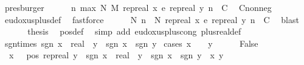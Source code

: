 \begin{isabellebody}
\ presburger\isanewline
\ \ \ \ \isamarkupfalse%
\ {\isachardoublequoteopen}{\isasymforall}n{\isasymge}\ max\ N\ M{\isachardot}{\kern0pt}\ {\isacharparenleft}{\kern0pt}rep{\isacharunderscore}{\kern0pt}real\ x\ {\isacharplus}{\kern0pt}\isactrlsub e\ rep{\isacharunderscore}{\kern0pt}real\ y{\isacharparenright}{\kern0pt}\ n\ {\isasymge}\ C{\isachardoublequoteclose}\ \isamarkupfalse%
\ C{\isacharunderscore}{\kern0pt}nonneg\ \isamarkupfalse%
\ eudoxus{\isacharunderscore}{\kern0pt}plus{\isacharunderscore}{\kern0pt}def\ \isamarkupfalse%
\ fastforce\isanewline
\ \ \ \ \isamarkupfalse%
\ {\isachardoublequoteopen}{\isasymexists}N{\isachardot}{\kern0pt}\ {\isasymforall}n\ {\isasymge}\ N{\isachardot}{\kern0pt}\ {\isacharparenleft}{\kern0pt}rep{\isacharunderscore}{\kern0pt}real\ x\ {\isacharplus}{\kern0pt}\isactrlsub e\ rep{\isacharunderscore}{\kern0pt}real\ y{\isacharparenright}{\kern0pt}\ n\ {\isasymge}\ C{\isachardoublequoteclose}\ \isamarkupfalse%
\ blast\isanewline
\ \ \isacommand{{\isacharbraceright}{\kern0pt}}\isamarkupfalse%
\isanewline
\ \ \isamarkupfalse%
\ {\isacharquery}{\kern0pt}thesis\ \isamarkupfalse%
\ pos{\isacharunderscore}{\kern0pt}def\ \isamarkupfalse%
\ {\isacharparenleft}{\kern0pt}simp\ add{\isacharcolon}{\kern0pt}\ eudoxus{\isacharunderscore}{\kern0pt}plus{\isacharunderscore}{\kern0pt}cong\ plus{\isacharunderscore}{\kern0pt}real{\isacharunderscore}{\kern0pt}def{\isacharparenright}{\kern0pt}\isanewline
{}\isamarkupfalse%
%
\endisatagproof
{\isafoldproof}%
%
\isadelimproof
\isanewline
%
\endisadelimproof
\isanewline
{}\isamarkupfalse%
\ sgn{\isacharunderscore}{\kern0pt}times{\isacharcolon}{\kern0pt}\ {\isachardoublequoteopen}sgn\ {\isacharparenleft}{\kern0pt}{\isacharparenleft}{\kern0pt}x\ {\isacharcolon}{\kern0pt}{\isacharcolon}{\kern0pt}\ real{\isacharparenright}{\kern0pt}\ {\isacharasterisk}{\kern0pt}\ y{\isacharparenright}{\kern0pt}\ {\isacharequal}{\kern0pt}\ sgn\ x\ {\isacharasterisk}{\kern0pt}\ sgn\ y{\isachardoublequoteclose}\isanewline
%
\isadelimproof
%
\endisadelimproof
%
\isatagproof
{}\isamarkupfalse%
\ {\isacharparenleft}{\kern0pt}cases\ {\isachardoublequoteopen}x\ {\isacharequal}{\kern0pt}\ {}\ {\isasymor}\ y\ {\isacharequal}{\kern0pt}\ {}{\isachardoublequoteclose}{\isacharparenright}{\kern0pt}\isanewline
\ \ \isamarkupfalse%
\ False\isanewline
\ \ \isamarkupfalse%
\ {\isacharasterisk}{\kern0pt}{\isacharcolon}{\kern0pt}\ {\isachardoublequoteopen}{\isasymlbrakk}x\ {\isasymnoteq}\ {}{\isacharsemicolon}{\kern0pt}\ pos\ {\isacharparenleft}{\kern0pt}rep{\isacharunderscore}{\kern0pt}real\ y{\isacharparenright}{\kern0pt}{\isasymrbrakk}\ {\isasymLongrightarrow}\ sgn\ {\isacharparenleft}{\kern0pt}{\isacharparenleft}{\kern0pt}x\ {\isacharcolon}{\kern0pt}{\isacharcolon}{\kern0pt}\ real{\isacharparenright}{\kern0pt}\ {\isacharasterisk}{\kern0pt}\ y{\isacharparenright}{\kern0pt}\ {\isacharequal}{\kern0pt}\ sgn\ x\ {\isacharasterisk}{\kern0pt}\ sgn\ y{\isachardoublequoteclose}\ \ x\ y\isanewline

\end{isabellebody}
